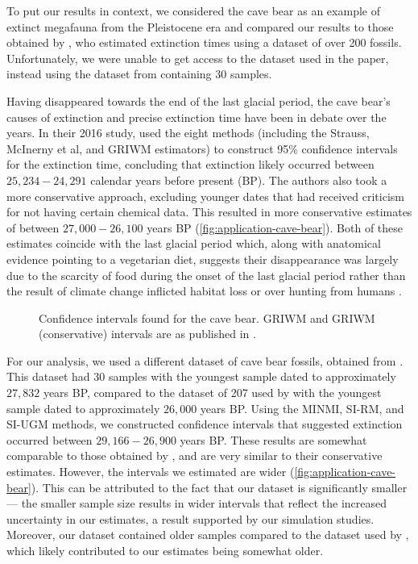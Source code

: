 To put our results in context, we considered the cave bear as an example of extinct megafauna from the Pleistocene era and compared our results to those obtained by \citet{Baca2016}, who estimated extinction times using a dataset of over 200 fossils. Unfortunately, we were unable to get access to the dataset used in the paper, instead using the dataset from \citet{Cooper2015} containing 30 samples.

Having disappeared towards the end of the last glacial period, the cave bear's causes of extinction and precise extinction time have been in debate over the years. In their 2016 study, \citet{Baca2016} used the eight methods (including the Strauss, McInerny et al, and GRIWM estimators) to construct 95\% confidence intervals for the extinction time, concluding that extinction likely occurred between $25,234 - 24,291$ calendar years before present (BP). The authors also took a more conservative approach, excluding younger dates that had received criticism for not having certain chemical data. This resulted in more conservative estimates of between $27,000 - 26,100$ years BP (\autoref{fig:application-cave-bear}). Both of these estimates coincide with the last glacial period which, along with anatomical evidence pointing to a vegetarian diet, suggests their disappearance was largely due to the scarcity of food during the onset of the last glacial period rather than the result of climate change inflicted habitat loss or over hunting from humans \cite{Pacher2009}.
\begin{figure}[ht]
    \centering
    
    \caption{Confidence intervals found for the cave bear. GRIWM and GRIWM (conservative) intervals are as published in \citet{Baca2016}.}
    \label{fig:application-cave-bear}
\end{figure}

For our analysis, we used a different dataset of cave bear fossils, obtained from \citet{Cooper2015}. This dataset had 30 samples with the youngest sample dated to approximately $27,832$ years BP, compared to the dataset of 207 used by \citet{Baca2016} with the youngest sample dated to approximately $26,000$ years BP. Using the MINMI, SI-RM, and SI-UGM methods, we constructed confidence intervals that suggested extinction occurred between $29,166 - 26,900$ years BP. These results are somewhat comparable to those obtained by \citet{Baca2016}, and are very similar to their conservative estimates. However, the intervals we estimated are wider (\autoref{fig:application-cave-bear}). This can be attributed to the fact that our dataset is significantly smaller --- the smaller sample size results in wider intervals that reflect the increased uncertainty in our estimates, a result supported by our simulation studies. Moreover, our dataset contained older samples compared to the dataset used by \citet{Baca2016}, which likely contributed to our estimates being somewhat older.